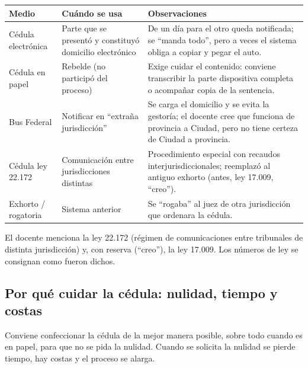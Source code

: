 \documentclass[12pt,oneside]{book}
\begin{document}
\begin{center}
\small
\begin{tabularx}{\textwidth}{@{}p{2.6cm}p{3.6cm}X@{}}
\toprule
\textbf{Medio} & \textbf{Cu\'ando se usa} & \textbf{Observaciones} \\
\midrule
C\'edula electr\'onica & Parte que se present\'o y constituy\'o domicilio electr\'onico & De un d\'ia para el otro queda notificada; se ``manda todo'', pero a veces el sistema obliga a copiar y pegar el auto. \\
\addlinespace
C\'edula en papel & Rebelde (no particip\'o del proceso) & Exige cuidar el contenido: conviene transcribir la parte dispositiva completa o acompa\~nar copia de la sentencia. \\
\addlinespace
Bus Federal & Notificar en ``extra\~na jurisdicci\'on'' & Se carga el domicilio y se evita la gestor\'ia; el docente cree que funciona de provincia a Ciudad, pero no tiene certeza de Ciudad a provincia. \\
\addlinespace
C\'edula ley 22.172 & Comunicaci\'on entre jurisdicciones distintas & Procedimiento especial con recaudos interjurisdiccionales; reemplaz\'o al antiguo exhorto (antes, ley 17.009, ``creo''). \\
\addlinespace
Exhorto / rogatoria & Sistema anterior & Se ``rogaba'' al juez de otra jurisdicci\'on que ordenara la c\'edula. \\
\bottomrule
\end{tabularx}
\end{center}


\begin{note}
El docente menciona la ley 22.172 (r\'egimen de comunicaciones entre tribunales de distinta jurisdicci\'on) y, con reserva (``creo''), la ley 17.009. Los n\'umeros de ley se consignan como fueron dichos.
\end{note}

\subsection{Por qu\'e cuidar la c\'edula: nulidad, tiempo y costas}

Conviene confeccionar la c\'edula de la mejor manera posible, sobre todo cuando es en papel, para que no se pida la nulidad. Cuando se solicita la nulidad se pierde tiempo, hay costas y el proceso se alarga.
\end{document}
